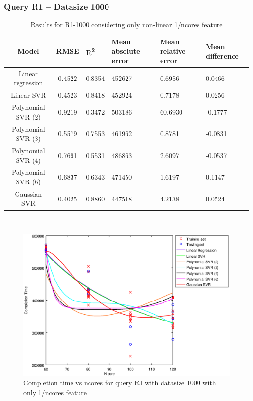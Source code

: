 \documentclass[a4paper,11pt]{article}
\begin{document}
\newpage
\subsubsection{Query R1 -- Datasize 1000}
\begin{table}[H]
	\centering
	\begin{adjustbox}{center}
		\begin{tabular}{c | c M{1.2cm} M{2.5cm} M{2.5cm} M{1.8cm}}
			Model & RMSE & R\textsuperscript{2} & Mean absolute error & Mean relative error & Mean difference \tabularnewline
			\hline
			Linear regression & 0.4522 & 0.8354 & 452627 & 0.6956 & 0.0466 \\
			Linear SVR & 0.4523 & 0.8418 & 452924 & 0.7178 & 0.0256 \\
			Polynomial SVR (2) & 0.9219 & 0.3472 & 503186 & 60.6930 & -0.1777 \\
			Polynomial SVR (3) & 0.5579 & 0.7553 & 461962 & 0.8781 & -0.0831 \\
			Polynomial SVR (4) & 0.7691 & 0.5531 & 486863 & 2.6097 & -0.0537 \\
			Polynomial SVR (6) & 0.6837 & 0.6343 & 471450 & 1.6197 & 0.1147 \\
			Gaussian SVR & 0.4025 & 0.8860 & 447518 & 4.2138 & 0.0524 \\
		\end{tabular}
	\end{adjustbox}
	\\
	\caption{Results for R1-1000 considering only non-linear 1/ncores feature}
	\label{table_R1_prediction_all}
\end{table}

\begin {figure}[hbtp]
\centering
\includegraphics[width=\textwidth]{output/R1_1000_ONLY_1_OVER_NCORES/plot_R1_1000.eps}
\caption {Completion time vs ncores for query R1 with datasize 1000 with only 1/ncores feature}
\end {figure}
\end{document}
